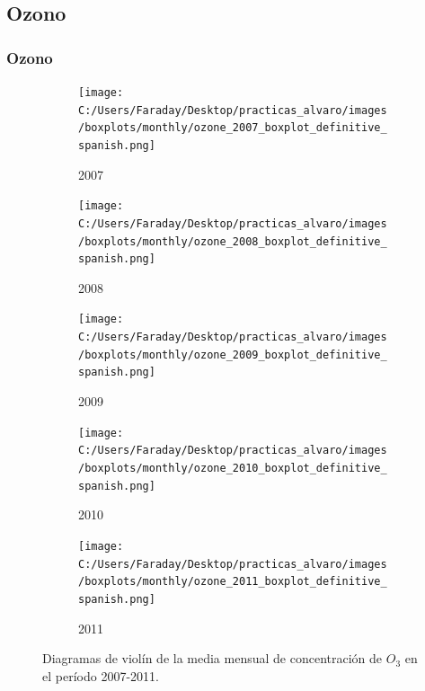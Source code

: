 \documentclass[12pt]{beamer}
\begin{document}
\subsection{Ozono}
\begin{frame}[squeeze]
\frametitle{Ozono}
\begin{figure}[H]
\centering
\begin{subfigure}[H]{0.32\textwidth}
\texttt{[image: C:/Users/Faraday/Desktop/practicas\_alvaro/images/boxplots/monthly/ozone\_2007\_boxplot\_definitive\_spanish.png]}
\captionsetup{labelformat=empty}
\caption{\scriptsize 2007}
\label{fig:box-ozone-2007}
\end{subfigure}
%
\begin{subfigure}[H]{0.32\textwidth}
\texttt{[image: C:/Users/Faraday/Desktop/practicas\_alvaro/images/boxplots/monthly/ozone\_2008\_boxplot\_definitive\_spanish.png]}
\captionsetup{labelformat=empty}
\caption{\scriptsize 2008}
\label{fig:box-ozone-2008}
\end{subfigure}
%
\begin{subfigure}[H]{0.32\textwidth}
\texttt{[image: C:/Users/Faraday/Desktop/practicas\_alvaro/images/boxplots/monthly/ozone\_2009\_boxplot\_definitive\_spanish.png]}
\captionsetup{labelformat=empty}
\caption{\scriptsize 2009}
\label{fig:box-ozone-2009}
\end{subfigure}

\begin{subfigure}[H]{0.32\textwidth}
\texttt{[image: C:/Users/Faraday/Desktop/practicas\_alvaro/images/boxplots/monthly/ozone\_2010\_boxplot\_definitive\_spanish.png]}
\captionsetup{labelformat=empty}
\caption{\scriptsize 2010}
\label{fig:box-ozone-2010}
\end{subfigure}
%
\begin{subfigure}[H]{0.32\textwidth}
\texttt{[image: C:/Users/Faraday/Desktop/practicas\_alvaro/images/boxplots/monthly/ozone\_2011\_boxplot\_definitive\_spanish.png]}
\captionsetup{labelformat=empty}
\caption{\scriptsize 2011}
\label{fig:box-ozone-2011}
\end{subfigure}
\caption{\scriptsize Diagramas de violín de la media mensual de concentración de $O_{3}$ en el período 2007-2011.}
\label{fig:box-ozone-monthly}
\end{figure}
\end{frame}
\end{document}
